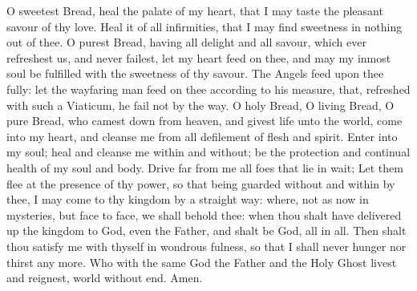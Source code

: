 O sweetest Bread, heal the palate of my heart, that I may taste the pleasant savour of thy love. Heal it of all infirmities, that I may find sweetness in nothing out of thee. O purest Bread, having all delight and all savour, which ever refreshest us, and never failest, let my heart feed on thee, and may my inmost soul be fulfilled with the sweetness of thy savour. The Angels feed upon thee fully: let the wayfaring man feed on thee according to his measure, that, refreshed with such a Viaticum, he fail not by the way. O holy Bread, O living Bread, O pure Bread, who camest down from heaven, and givest life unto the world, come into my heart, and cleanse me from all defilement of flesh and spirit. Enter into my soul; heal and cleanse me within and without; be the protection and continual health of my soul and body. Drive far from me all foes that lie in wait; Let them flee at the presence of thy power, so that being guarded without and within by thee, I may come to thy kingdom by a straight way: where, not as now in mysteries, but face to face, we shall behold thee: when thou shalt have delivered up the kingdom to God, even the Father, and shalt be God, all in all. Then shalt thou satisfy me with thyself in wondrous fulness, so that I shall never hunger nor thirst any more. Who with the same God the Father and the Holy Ghost livest and reignest, world without end. Amen. 
